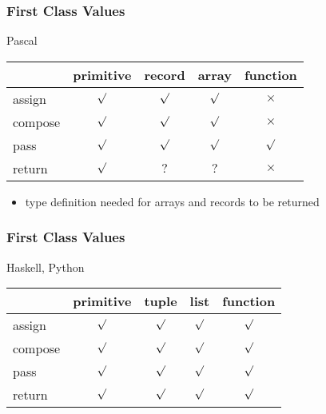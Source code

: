 \documentclass[dvipsnames]{beamer}
\theoremstyle{plain}
\begin{document}
\begin{frame}
  \frametitle{First Class Values}

  \begin{block}{Pascal}
    \begin{table}
      \begin{tabular}{l||c|c|c|c}
                & primitive & record  &  array  & function \\\hline\hline
        assign  &  $\surd$  & $\surd$ & $\surd$ & $\times$ \\\hline
        compose &  $\surd$  & $\surd$ & $\surd$ & $\times$ \\\hline
        pass    &  $\surd$  & $\surd$ & $\surd$ & $\surd$  \\\hline
        return  &  $\surd$  &   $?$   &   $?$   & $\times$
      \end{tabular}
    \end{table}
  \end{block}

  \begin{itemize}
    \item type definition needed for arrays and records to be returned
  \end{itemize}
\end{frame}

\begin{frame}
  \frametitle{First Class Values}

  \begin{block}{Haskell, Python}
    \begin{table}
      \begin{tabular}{l||c|c|c|c}
                & primitive &  tuple  &  list   & function\\\hline\hline
        assign  &  $\surd$  & $\surd$ & $\surd$ & $\surd$ \\\hline
        compose &  $\surd$  & $\surd$ & $\surd$ & $\surd$ \\\hline
        pass    &  $\surd$  & $\surd$ & $\surd$ & $\surd$ \\\hline
        return  &  $\surd$  & $\surd$ & $\surd$ & $\surd$
      \end{tabular}
    \end{table}
  \end{block}
\end{frame}
\end{document}
